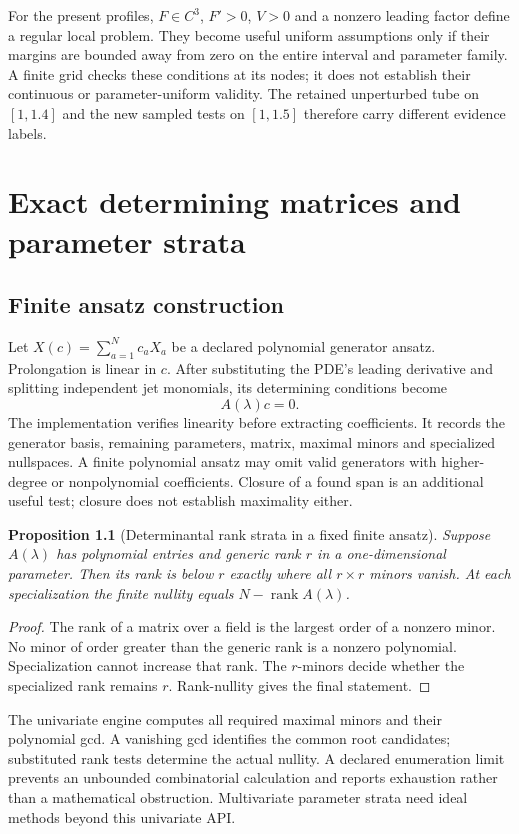 \documentclass[12pt,a4paper,oneside]{report}
\numberwithin{equation}{chapter}
\newtheorem{proposition}[theorem]{Proposition}
\newcommand{\rank}{\operatorname{rank}}
\begin{document}
For the present profiles, $F\in C^3$, $F'>0$, $V>0$ and a nonzero leading
factor define a regular local problem. They become useful uniform assumptions
only if their margins are bounded away from zero on the entire interval and
parameter family. A finite grid checks these conditions at its nodes; it does
not establish their continuous or parameter-uniform validity. The retained
unperturbed tube on $[1,1.4]$ and the new sampled tests on $[1,1.5]$ therefore
carry different evidence labels.

\chapter{Exact determining matrices and parameter strata}\label{ch:strata}
\section{Finite ansatz construction}
Let $X(c)=\sum_{a=1}^N c_aX_a$ be a declared polynomial generator ansatz.
Prolongation is linear in $c$. After substituting the PDE's leading derivative
and splitting independent jet monomials, its determining conditions become
\begin{equation}\label{eq:matrix}
A(\lambda)c=0.
\end{equation}
The implementation verifies linearity before extracting coefficients. It
records the generator basis, remaining parameters, matrix, maximal minors and
specialized nullspaces. A finite polynomial ansatz may omit valid generators
with higher-degree or nonpolynomial coefficients. Closure of a found span is
an additional useful test; closure does not establish maximality either.

\begin{proposition}[Determinantal rank strata in a fixed finite ansatz]
Suppose $A(\lambda)$ has polynomial entries and generic rank $r$ in a
one-dimensional parameter. Then its rank is below $r$ exactly where all
$r\times r$ minors vanish. At each specialization the finite nullity equals
$N-\rank A(\lambda)$.
\end{proposition}
\begin{proof}
The rank of a matrix over a field is the largest order of a nonzero minor.
No minor of order greater than the generic rank is a nonzero polynomial.
Specialization cannot increase that rank. The $r$-minors decide whether the
specialized rank remains $r$. Rank-nullity gives the final statement.
\end{proof}
The univariate engine computes all required maximal minors and their
polynomial gcd. A vanishing gcd identifies the common root candidates;
substituted rank tests determine the actual nullity. A declared enumeration
limit prevents an unbounded combinatorial calculation and reports exhaustion
rather than a mathematical obstruction. Multivariate parameter strata need
ideal methods beyond this univariate API.
\end{document}
